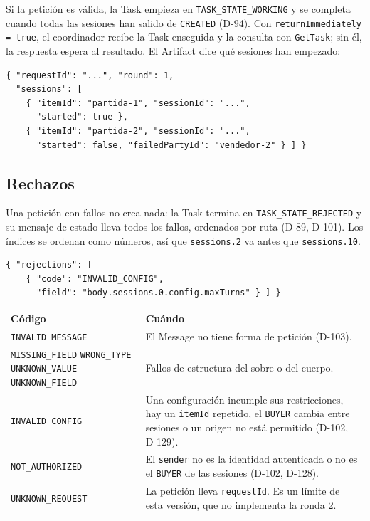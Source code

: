 Si la petición es válida, la Task empieza en \texttt{TASK\_STATE\_WORKING} y se completa cuando todas las sesiones han salido de \texttt{CREATED} (D-94). Con \texttt{returnImmediately = true}, el coordinador recibe la Task enseguida y la consulta con \texttt{GetTask}; sin él, la respuesta espera al resultado. El Artifact dice qué sesiones han empezado:

\begin{verbatim}
{ "requestId": "...", "round": 1,
  "sessions": [
    { "itemId": "partida-1", "sessionId": "...",
      "started": true },
    { "itemId": "partida-2", "sessionId": "...",
      "started": false, "failedPartyId": "vendedor-2" } ] }
\end{verbatim}

\subsection{Rechazos}

Una petición con fallos no crea nada: la Task termina en \texttt{TASK\_STATE\_REJECTED} y su mensaje de estado lleva todos los fallos, ordenados por ruta (D-89, D-101). Los índices se ordenan como números, así que \texttt{sessions.2} va antes que \texttt{sessions.10}.

\begin{verbatim}
{ "rejections": [
    { "code": "INVALID_CONFIG",
      "field": "body.sessions.0.config.maxTurns" } ] }
\end{verbatim}

\begin{tabular}{p{4.2cm}p{9.3cm}}
  \textbf{Código} & \textbf{Cuándo} \\
  \texttt{INVALID\_MESSAGE} & El Message no tiene forma de petición (D-103). \\
  \texttt{MISSING\_FIELD} \newline \texttt{WRONG\_TYPE} \newline \texttt{UNKNOWN\_VALUE} \newline \texttt{UNKNOWN\_FIELD} & Fallos de estructura del sobre o del cuerpo. \\
  \texttt{INVALID\_CONFIG} & Una configuración incumple sus restricciones, hay un \texttt{itemId} repetido, el \texttt{BUYER} cambia entre sesiones o un origen no está permitido (D-102, D-129). \\
  \texttt{NOT\_AUTHORIZED} & El \texttt{sender} no es la identidad autenticada o no es el \texttt{BUYER} de las sesiones (D-102, D-128). \\
  \texttt{UNKNOWN\_REQUEST} & La petición lleva \texttt{requestId}. Es un límite de esta versión, que no implementa la ronda 2. \\
\end{tabular}

